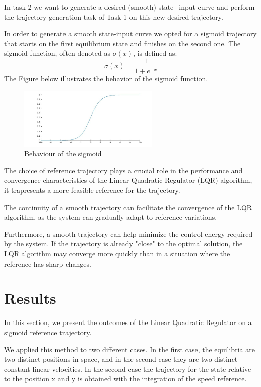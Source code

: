 In task 2 we want to generate a desired (smooth) state$-$input curve and perform the trajectory generation task of Task 1 on this new desired trajectory.

In order to generate a smooth state-input curve we opted for a sigmoid trajectory that starts on the first equilibrium state and finishes on the second one.
The sigmoid function, often denoted as $\sigma(x)$, is defined as:
\[
\sigma(x) = \frac{1}{1 + e^{-x}}
\]
The Figure below illustrates the behavior of the sigmoid function.

\begin{figure}[h]
  \centering
  \includegraphics[width=0.6\textwidth]{pictures/sigmoide_graph.png}
  \caption{Behaviour of the sigmoid}
  \label{fig:sigmoid_plot}
\end{figure}

The choice of reference trajectory plays a crucial role in the performance and convergence characteristics of the Linear Quadratic Regulator (LQR) algorithm, it trapresents a more feasible reference for the trajectory.

The continuity of a smooth trajectory can facilitate the convergence of the LQR algorithm, as the system can gradually adapt to reference variations.

Furthermore, a smooth trajectory can help minimize the control energy required by the system. If the trajectory is already "close" to the optimal solution, the LQR algorithm may converge more quickly than in a situation where the reference has sharp changes.

\section{Results}
In this section, we present the outcomes of the Linear Quadratic Regulator on a sigmoid reference trajectory.

We applied this method to two different cases. In the first case, the equilibria are two distinct positions in space, and in the second case they are two distinct constant linear velocities. In the second case the trajectory for the state relative to the position x and y is obtained with the integration of the speed reference.

